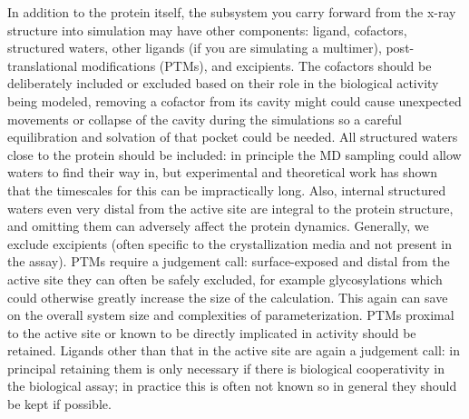 \documentclass[9pt,bestpractices]{livecoms}
\begin{document}
In addition to the protein itself, the subsystem you carry forward from the x-ray structure into simulation may have other components: ligand, cofactors, structured waters, other ligands (if you are simulating a multimer), post-translational modifications (PTMs), and excipients. The cofactors should be deliberately included or excluded based on their role in the biological activity being modeled, removing a cofactor from its cavity might could cause unexpected movements or collapse of the cavity during the simulations so a careful equilibration and solvation of that pocket could be needed. All structured waters close to the protein should be included: in principle the MD sampling could allow waters to find their way in, but experimental and theoretical work has shown that the timescales for this can be impractically long. Also, internal structured waters even very distal from the active site are integral to the protein structure, and omitting them can adversely affect the protein dynamics. Generally, we exclude excipients (often specific to the crystallization media and not present in the assay). PTMs require a judgement call: surface-exposed and distal from the active site they can often be safely excluded, for example glycosylations which could otherwise greatly increase the size of the calculation. This again can save on the overall system size and complexities of parameterization. PTMs proximal to the active site or known to be directly implicated in activity should be retained. Ligands other than that in the active site are again a judgement call: in principal retaining them is only necessary if there is biological cooperativity in the biological assay; in practice this is often not known so in general they should be kept if possible. 
\end{document}
